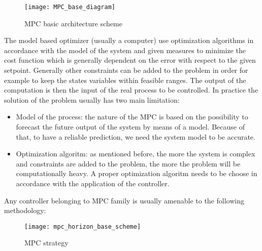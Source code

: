 \begin{figure}[h!]
	\centering
	\texttt{[image: MPC\_base\_diagram]}
	\caption{MPC basic architecture scheme}
	\label{mpc_base_diagram}
\end{figure}
The model based optimizer (usually a computer) use optimization algorithms in accordance with the model of the system and given measures to minimize the cost function which is generally dependent on the error with respect to the given setpoint. Generally other constraints can be added to the problem in order for example to keep the states variables within feasible ranges. The output of the computation is then the input of the real process to be controlled. In  practice the solution of the problem usually has two main limitation:

\begin{itemize}
\item Model of the process: the nature of the MPC is based on the possibility to forecast the future output of the system by means of a model. Because of that, to have a reliable prediction, we need the system model to be accurate.

\item Optimization algoritm: as mentioned before, the more the system is complex and constraints are added to the problem, the more the problem will be computationally heavy. A proper optimization algoritm needs to be choose in accordance with the application of the controller.
  
\end{itemize}
Any controller belonging to MPC family is usually amenable to the following methodology:
\begin{figure}[h!]
	\centering
	\texttt{[image: mpc\_horizon\_base\_scheme]}
	\caption{MPC strategy}
	\label{mpc_horizon_base_scheme}
\end{figure}

